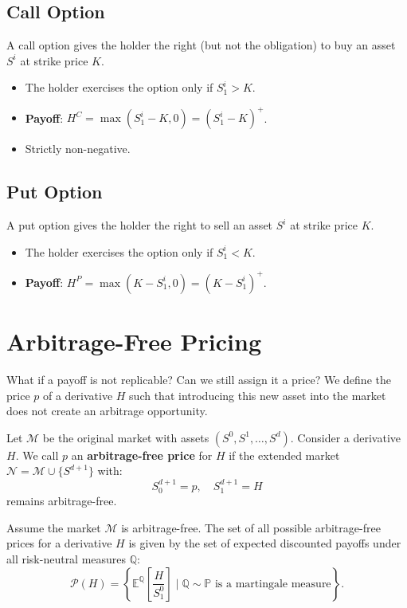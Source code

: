 \subsection{Call Option}
A call option gives the holder the right (but not the obligation) to buy an asset $S^i$ at strike price $K$.
\begin{itemize}
    \item The holder exercises the option only if $S_1^i > K$.
    \item \textbf{Payoff}: $H^C = \max(S_1^i - K, 0) = (S_1^i - K)^+$.
    \item Strictly non-negative.
\end{itemize}

\subsection{Put Option}
A put option gives the holder the right to sell an asset $S^i$ at strike price $K$.
\begin{itemize}
    \item The holder exercises the option only if $S_1^i < K$.
    \item \textbf{Payoff}: $H^P = \max(K - S_1^i, 0) = (K - S_1^i)^+$.
\end{itemize}

\section{Arbitrage-Free Pricing}

What if a payoff is not replicable? Can we still assign it a price?
We define the price $p$ of a derivative $H$ such that introducing this new asset into the market does not create an arbitrage opportunity.

\begin{definition}
Let $\mathcal{M}$ be the original market with assets $(S^0, S^1, \dots, S^d)$.
Consider a derivative $H$. We call $p$ an \textbf{arbitrage-free price} for $H$ if the extended market $\mathcal{N} = \mathcal{M} \cup \{S^{d+1}\}$ with:
\begin{equation}
    S_0^{d+1} = p, \quad S_1^{d+1} = H
\end{equation}
remains arbitrage-free.
\end{definition}

\begin{theorem}
Assume the market $\mathcal{M}$ is arbitrage-free. The set of all possible arbitrage-free prices for a derivative $H$ is given by the set of expected discounted payoffs under all risk-neutral measures $\mathbb{Q}$:
\begin{equation}
    \mathcal{P}(H) = \left\{ \mathbb{E}^\mathbb{Q} \left[ \frac{H}{S_1^0} \right] \mid \mathbb{Q} \sim \mathbb{P} \text{ is a martingale measure} \right\}.
\end{equation}
\end{theorem}

